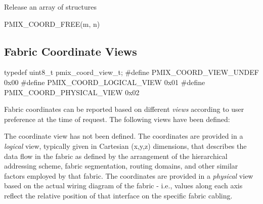 \begin{arglist}
\end{arglist}


Release an array of  structures

\cspecificstart
\begin{codepar}
PMIX_COORD_FREE(m, n)
\end{codepar}
\cspecificend

\begin{arglist}
\end{arglist}


\subsection{Fabric Coordinate Views}

\cspecificstart
\begin{codepar}
typedef uint8_t pmix_coord_view_t;
#define PMIX_COORD_VIEW_UNDEF       0x00
#define PMIX_COORD_LOGICAL_VIEW     0x01
#define PMIX_COORD_PHYSICAL_VIEW    0x02
\end{codepar}
\cspecificend

Fabric coordinates can be reported based on different \emph{views} according to user preference at the time of request. The following views have been defined:

\begin{constantdesc}
%
The coordinate view has not been defined.
%
The coordinates are provided in a \emph{logical} view, typically given in Cartesian (x,y,z) dimensions, that describes the data flow in the fabric as defined by the arrangement of the hierarchical addressing scheme, fabric segmentation, routing domains, and other similar factors employed by that fabric.
%
The coordinates are provided in a \emph{physical} view based on the actual wiring diagram of the fabric - i.e., values along each axis reflect the relative position of that interface on the specific fabric cabling.
%
\end{constantdesc}


